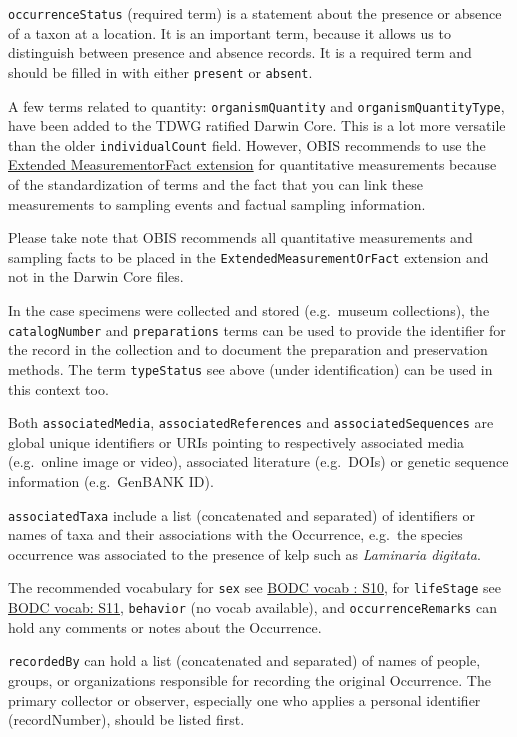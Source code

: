 \documentclass[
  letterpaper,
  DIV=11,
  numbers=noendperiod,
  oneside]{scrreprt}
\begin{document}
\texttt{occurrenceStatus} (required term) is a statement about the
presence or absence of a taxon at a location. It is an important term,
because it allows us to distinguish between presence and absence
records. It is a required term and should be filled in with either
\texttt{present} or \texttt{absent}.

A few terms related to quantity: \texttt{organismQuantity} and
\texttt{organismQuantityType}, have been added to the TDWG ratified
Darwin Core. This is a lot more versatile than the older
\texttt{individualCount} field. However, OBIS recommends to use the
\protect\hyperlink{extendedmeasurementorfact-extension-emof}{Extended
MeasurementorFact extension} for quantitative measurements because of
the standardization of terms and the fact that you can link these
measurements to sampling events and factual sampling information.

Please take note that OBIS recommends all quantitative measurements and
sampling facts to be placed in the \texttt{ExtendedMeasurementOrFact}
extension and not in the Darwin Core files.

In the case specimens were collected and stored (e.g.~museum
collections), the \texttt{catalogNumber} and \texttt{preparations} terms
can be used to provide the identifier for the record in the collection
and to document the preparation and preservation methods. The term
\texttt{typeStatus} see above (under identification) can be used in this
context too.

Both \texttt{associatedMedia}, \texttt{associatedReferences} and
\texttt{associatedSequences} are global unique identifiers or URIs
pointing to respectively associated media (e.g.~online image or video),
associated literature (e.g.~DOIs) or genetic sequence information
(e.g.~GenBANK ID).

\texttt{associatedTaxa} include a list (concatenated and separated) of
identifiers or names of taxa and their associations with the Occurrence,
e.g.~the species occurrence was associated to the presence of kelp such
as \emph{Laminaria digitata}.

The recommended vocabulary for \texttt{sex} see
\href{http://vocab.nerc.ac.uk/collection/S10/current/}{BODC vocab :
S10}, for \texttt{lifeStage} see
\href{http://vocab.nerc.ac.uk/collection/S11/current/}{BODC vocab: S11},
\texttt{behavior} (no vocab available), and \texttt{occurrenceRemarks}
can hold any comments or notes about the Occurrence.

\texttt{recordedBy} can hold a list (concatenated and separated) of
names of people, groups, or organizations responsible for recording the
original Occurrence. The primary collector or observer, especially one
who applies a personal identifier (recordNumber), should be listed
first.
\end{document}

